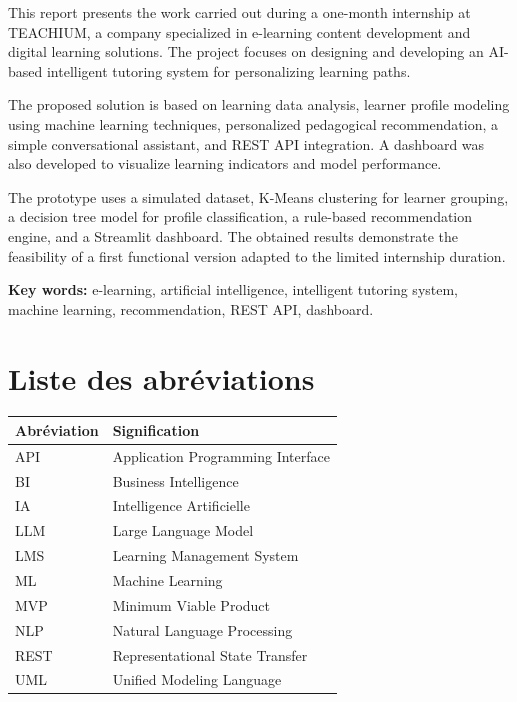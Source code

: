 \documentclass[12pt,a4paper]{report}
\begin{document}
This report presents the work carried out during a one-month internship at TEACHIUM, a company specialized in e-learning content development and digital learning solutions. The project focuses on designing and developing an AI-based intelligent tutoring system for personalizing learning paths.

The proposed solution is based on learning data analysis, learner profile modeling using machine learning techniques, personalized pedagogical recommendation, a simple conversational assistant, and REST API integration. A dashboard was also developed to visualize learning indicators and model performance.

The prototype uses a simulated dataset, K-Means clustering for learner grouping, a decision tree model for profile classification, a rule-based recommendation engine, and a Streamlit dashboard. The obtained results demonstrate the feasibility of a first functional version adapted to the limited internship duration.

\textbf{Key words:} e-learning, artificial intelligence, intelligent tutoring system, machine learning, recommendation, REST API, dashboard.

\tableofcontents
\listoffigures
\listoftables

\chapter*{Liste des abréviations}
\begin{longtable}{|p{3cm}|p{11cm}|}
\hline
\textbf{Abréviation} & \textbf{Signification} \\
\hline
API & Application Programming Interface \\
\hline
BI & Business Intelligence \\
\hline
IA & Intelligence Artificielle \\
\hline
LLM & Large Language Model \\
\hline
LMS & Learning Management System \\
\hline
ML & Machine Learning \\
\hline
MVP & Minimum Viable Product \\
\hline
NLP & Natural Language Processing \\
\hline
REST & Representational State Transfer \\
\hline
UML & Unified Modeling Language \\
\hline
\end{longtable}
\end{document}
